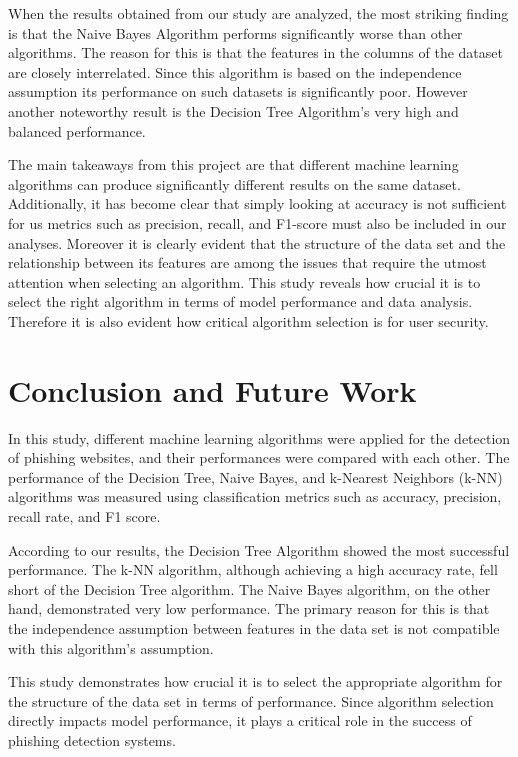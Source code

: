 \documentclass[conference]{IEEEtran}
\begin{document}
When the results obtained from our study are analyzed, the most striking finding is that the Naive Bayes Algorithm performs significantly worse than other algorithms. The reason for this is that the features in the columns of the dataset are closely interrelated. Since this algorithm is based on the independence assumption its performance on such datasets is significantly poor. However another noteworthy result is the Decision Tree Algorithm's very high and balanced performance.

The main takeaways from this project are that different machine learning algorithms can produce significantly different results on the same dataset. Additionally, it has become clear that simply looking at accuracy is not sufficient for us metrics such as precision, recall, and F1-score must also be included in our analyses. Moreover it is clearly evident that the structure of the data set and the relationship between its features are among the issues that require the utmost attention when selecting an algorithm.  This study reveals how crucial it is to select the right algorithm in terms of model performance and data analysis. Therefore it is also evident how critical algorithm selection is for user security.
	
	\section{Conclusion and Future Work}
	\label{sec:conclusion}
	
In this study, different machine learning algorithms were applied for the detection of phishing websites, and their performances were compared with each other. The performance of the Decision Tree, Naive Bayes, and k-Nearest Neighbors (k-NN) algorithms was measured using classification metrics such as accuracy, precision, recall rate, and F1 score.

According to our results, the Decision Tree Algorithm showed the most successful performance. The k-NN algorithm, although achieving a high accuracy rate, fell short of the Decision Tree algorithm. The Naive Bayes algorithm, on the other hand, demonstrated very low performance. The primary reason for this is that the independence assumption between features in the data set is not compatible with this algorithm's assumption.

This study demonstrates how crucial it is to select the appropriate algorithm for the structure of the data set in terms of performance. Since algorithm selection directly impacts model performance, it plays a critical role in the success of phishing detection systems.
\end{document}
